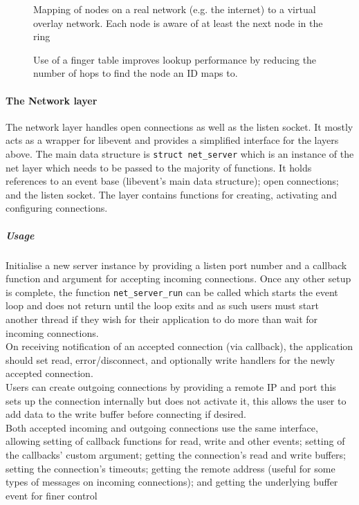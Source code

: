 \documentclass{article}
\begin{document}
\begin{figure}
\centering
\def\svgwidth{\columnwidth}

\caption{Mapping of nodes on a real network (e.g. the internet) to a virtual overlay network. Each node is aware of at least the next node in the ring}
\label{fig:rtovmap}
\end{figure}


\begin{figure}
\centering
\def\svgwidth{\columnwidth}

\caption{Use of a finger table improves lookup performance by reducing the number of hops to find the node an ID maps to.}
\label{fig:fingersRbttr}
\end{figure}

\paragraph{The Network layer}
The network layer handles open connections as well as the listen socket. It mostly acts as a wrapper for libevent and provides a simplified interface for the layers above. The main data structure is \texttt{struct net\_server} which is an instance of the net layer which needs to be passed to the majority of functions. It holds references to an event base (libevent's main data structure); open connections; and the listen socket. The layer contains functions for creating, activating and configuring connections.

\subparagraph{Usage}
Initialise a new server instance by providing a listen port number and a callback function and argument for accepting incoming connections. Once any other setup is complete, the function \texttt{net\_server\_run} can be called which starts the event loop and does not return until the loop exits and as such users must start another thread if they wish for their application to do more than wait for incoming connections.
\\
On receiving notification of an accepted connection (via callback), the application should set read, error/disconnect, and optionally write handlers for the newly accepted connection.
\\
Users can create outgoing connections by providing a remote IP and port this sets up the connection internally but does not activate it, this allows the user to add data to the write buffer before connecting if desired.
\\
Both accepted incoming and outgoing connections use the same interface, allowing setting of callback functions for read, write and other events; setting of the callbacks' custom argument; getting the connection's read and write buffers; setting the connection's timeouts; getting the remote address (useful for some types of messages on incoming connections); and getting the underlying buffer event for finer control
\end{document}
